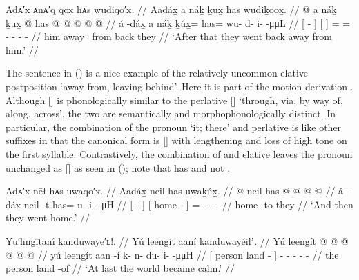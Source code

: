 \ex\label{ex:106-40-leave-behind}%
%
\begingl
	\glpreamble	Adᴀ′x ᴀnᴀ′q qox hᴀs wudiqo′x. //
	\glpreamble	Aadáx̱ a náḵ ḵux̱ has wudiḵoox̱. //
	\gla	{}  @ {} {}
		{} a náḵ {}
		ḵux̱ @ has @  @ {} @ {} @ {} @ {} //
	\glb	{} á -dáx̱ {} 
		{} a náḵ {} 
		ḵúx̱= has= wu- d- i-  -μμL //
	\glc	{}[  - {}]
		{}[   {}]
		= = - - -  - //
	\gld {}  {} {}
		{} him away·from {}
		back they  {} {} {} {} //
	\glft	‘After that they went back away from him.’
		//
\endgl
\xe

The sentence in (\lastx) is a nice example of the relatively uncommon elative postposition  ‘away from, leaving behind’.
Here it is part of the motion derivation .
Although  [] is phonologically similar to the perlative  [] ‘through, via, by way of, along, across’, the two are semantically and morphophonologically distinct.
In particular, the combination of the pronoun  ‘it; there’ and perlative  is like other suffixes in that the canonical form is  [] with lengthening and loss of high tone on the first syllable.
Contrastively, the combination of  and elative  leaves the pronoun unchanged as  [] as seen in (\lastx); note that \citeauthor{swanton:1909} has  and not .

\ex\label{ex:106-41-went-home}%
%
\begingl
	\glpreamble	Adᴀ′x nēł hᴀs uwaqo′x. //
	\glpreamble	Aadáx̱ neil has uwaḵúx̱. //
	\gla	{}  @ {} {}
		{} neil {} {} 
		has @  @ {} @ {} @ {} //
	\glb	{} á -dáx̱ {}
		{} neil -t {} 
		has= u- i-  -μH //
	\glc	{}[  - {}]
		{}[ home - {}]
		= - -  - //
	\gld	{}  {} {}
		{} home -to {}
		they  {} {} {} //
	\glft	‘And then they went home.’
		//
\endgl
\xe

\ex\label{ex:106-42-world-calm}%
%
\begingl
	\glpreamble	Yū′līngîtanî kanduwayē′ʟ!. //
	\glpreamble	Yú leengít aaní kanduwayéilʼ. //
	\gla	{} Yú leengít  @ {} {}
		 @ {} @ {} @ {} @ {} @ {} //
	\glb	{} yú leengít aan -í {}
		k- n- du- i-  -μμH //
	\glc	{}[  person land - {}]
		- - - -  - //
	\gld	{} the person land -of {}
		 {} {} {} {} {} //
	\glft	‘At last the world became calm.’
		//
\endgl
\xe

